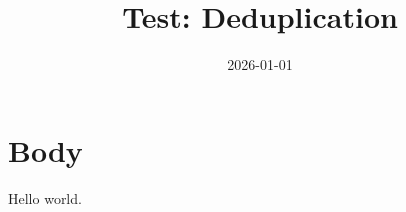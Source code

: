 \documentclass{article}
\title{Test: Deduplication}
\date{2026-01-01}
\begin{document}
\maketitle
\section{Body}
Hello world.
\end{document}
